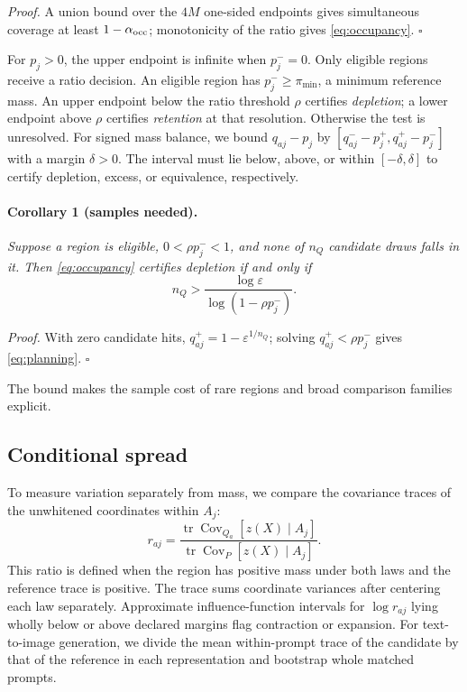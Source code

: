 \noindent\emph{Proof.} A union bound over the $4M$ one-sided endpoints
gives simultaneous coverage at least $1-\alpha_{\rm occ}$; monotonicity of the
ratio gives \cref{eq:occupancy}. \hfill$\square$

For $p_j>0$, the upper endpoint is infinite when $p_j^-=0$. Only eligible
regions receive a ratio decision. An eligible region has
$p_j^-\geq\pi_{\min}$, a minimum reference mass. An upper endpoint below
the ratio threshold $\rho$ certifies \emph{depletion}; a lower endpoint
above $\rho$ certifies \emph{retention} at that resolution. Otherwise the
test is unresolved. For signed mass balance, we bound $q_{aj}-p_j$ by
$[q_{aj}^--p_j^+,q_{aj}^+-p_j^-]$ with a margin $\delta>0$. The interval
must lie below, above, or within $[-\delta,\delta]$ to certify depletion,
excess, or equivalence, respectively.

\paragraph{Corollary 1 (samples needed).}
\emph{Suppose a region is eligible, $0<\rho p_j^-<1$, and none of $n_Q$
candidate draws falls in it. Then \cref{eq:occupancy} certifies depletion
if and only if}
\begin{equation}
n_Q>\frac{\log\varepsilon}{\log(1-\rho p_j^-)}.
\label{eq:planning}
\end{equation}

\noindent\emph{Proof.} With zero candidate hits,
$q_{aj}^+=1-\varepsilon^{1/n_Q}$; solving
$q_{aj}^+<\rho p_j^-$ gives \cref{eq:planning}. \hfill$\square$

The bound makes the sample cost of rare regions and broad comparison
families explicit.

\subsection{Conditional spread}
\label{sec:spread}
To measure variation separately from mass, we compare the covariance
traces of the unwhitened coordinates within $A_j$:
\begin{equation}
r_{aj}=\frac{\operatorname{tr}\operatorname{Cov}_{Q_a}[z(X)\mid A_j]}
{\operatorname{tr}\operatorname{Cov}_{P}[z(X)\mid A_j]}.
\label{eq:spread}
\end{equation}
This ratio is defined when the region has positive mass under both laws
and the reference trace is positive. The trace sums coordinate variances
after centering each law separately. Approximate influence-function
intervals for $\log r_{aj}$ lying wholly below or above declared margins
flag contraction or expansion. For text-to-image generation, we divide
the mean within-prompt trace of the candidate by that of the reference
in each representation and bootstrap whole matched prompts.

